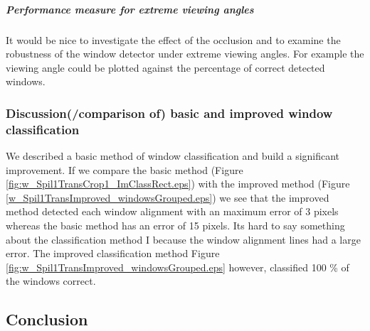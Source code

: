 \subparagraph{Performance measure for extreme viewing angles}
It would be nice to investigate the effect of the occlusion and to examine the
robustness of the window detector under extreme viewing angles.
For example the viewing angle could be plotted against the percentage of
correct detected windows.


\subsubsection{Discussion(/comparison of) basic and improved window classification}
We described a basic method of window classification and build a significant improvement.
If we compare the basic method (Figure \ref{fig:w_Spil1TransCrop1_ImClassRect.eps})
with the improved method (Figure \ref{w_Spil1TransImproved_windowsGrouped.eps})
we see that the improved method detected each window alignment with an maximum
error of 3 pixels whereas the basic method has an error of 15 pixels.  Its hard
to say something about the classification method I because the window alignment
lines had a large error.
The improved classification method Figure
\ref{fig:w_Spil1TransImproved_windowsGrouped.eps} however, classified 100 \% of
the windows correct.










\subsection{Conclusion}



